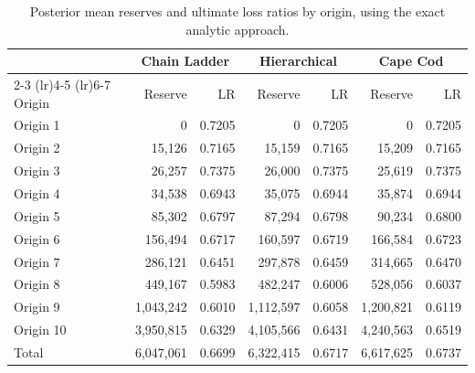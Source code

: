 \begin{table}[htbp]
\centering
\begin{tabular}{lrrrrrr}
\toprule
 & \multicolumn{2}{c}{Chain Ladder} & \multicolumn{2}{c}{Hierarchical} & \multicolumn{2}{c}{Cape Cod} \\
\cmidrule(lr){2-3} \cmidrule(lr){4-5} \cmidrule(lr){6-7}
Origin & Reserve & LR & Reserve & LR & Reserve & LR \\
\midrule
Origin 1 & 0 & 0.7205 & 0 & 0.7205 & 0 & 0.7205 \\
Origin 2 & 15,126 & 0.7165 & 15,159 & 0.7165 & 15,209 & 0.7165 \\
Origin 3 & 26,257 & 0.7375 & 26,000 & 0.7375 & 25,619 & 0.7375 \\
Origin 4 & 34,538 & 0.6943 & 35,075 & 0.6944 & 35,874 & 0.6944 \\
Origin 5 & 85,302 & 0.6797 & 87,294 & 0.6798 & 90,234 & 0.6800 \\
Origin 6 & 156,494 & 0.6717 & 160,597 & 0.6719 & 166,584 & 0.6723 \\
Origin 7 & 286,121 & 0.6451 & 297,878 & 0.6459 & 314,665 & 0.6470 \\
Origin 8 & 449,167 & 0.5983 & 482,247 & 0.6006 & 528,056 & 0.6037 \\
Origin 9 & 1,043,242 & 0.6010 & 1,112,597 & 0.6058 & 1,200,821 & 0.6119 \\
Origin 10 & 3,950,815 & 0.6329 & 4,105,566 & 0.6431 & 4,240,563 & 0.6519 \\
Total & 6,047,061 & 0.6699 & 6,322,415 & 0.6717 & 6,617,625 & 0.6737 \\
\bottomrule
\end{tabular}
\caption{Posterior mean reserves and ultimate loss ratios by origin, using the exact analytic approach.}
\label{tab:saluz_reserve_means_analytic}
\end{table}